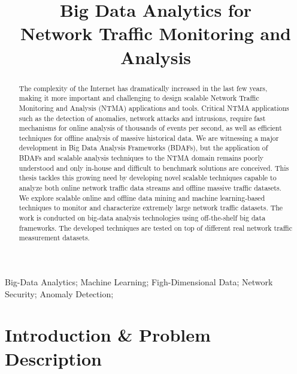 \documentclass[10pt, conference, letterpaper]{IEEEtran}
\begin{document}
\title{Big Data Analytics for\\Network Traffic Monitoring and Analysis}

\author{
\and
{}
}

\maketitle

\begin{abstract}
The complexity of the Internet has dramatically increased in the last few years, making it more important and challenging to design scalable Network Traffic Monitoring and Analysis (NTMA) applications and tools. Critical NTMA applications such as the detection of anomalies, network attacks and intrusions, require fast mechanisms for online analysis of thousands of events per second, as well as efficient techniques for offline analysis of massive historical data. We are witnessing a major development in Big Data Analysis Frameworks (BDAFs), but the application of BDAFs and scalable analysis techniques to the NTMA domain remains poorly understood and only in-house and difficult to benchmark solutions are conceived. This thesis tackles this growing need by developing novel scalable techniques capable to analyze both online network traffic data streams and offline massive traffic datasets. We explore scalable online and offline data mining and machine learning-based techniques to monitor and characterize extremely large network traffic datasets. The work is conducted on big-data analysis technologies using off-the-shelf big data frameworks. The developed techniques are tested on top of different real network traffic measurement datasets.\\
\end{abstract}

\begin{IEEEkeywords} 
Big-Data Analytics; Machine Learning; Figh-Dimensional Data; Network Security; Anomaly Detection; 
\end{IEEEkeywords} 

\section{Introduction \& Problem Description}\label{sectionI}
\end{document}
